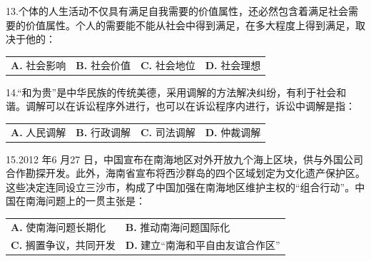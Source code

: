 \documentclass[UTF8,11pt]{ctexart}
\begin{document}
13.个体的人生活动不仅具有满足自我需要的价值属性，还必然包含着满足社会需要的价值属性。个人的需要能不能从社会中得到满足，在多大程度上得到满足，取决于他的：


\begin{center}\begin{tabular}{>{\raggedright\arraybackslash}p{\dimexpr(\linewidth-8\tabcolsep)/4\relax}>{\raggedright\arraybackslash}p{\dimexpr(\linewidth-8\tabcolsep)/4\relax}>{\raggedright\arraybackslash}p{\dimexpr(\linewidth-8\tabcolsep)/4\relax}>{\raggedright\arraybackslash}p{\dimexpr(\linewidth-8\tabcolsep)/4\relax}}
\textbf{A.} 社会影响 & \textbf{B.} 社会价值 & \textbf{C.} 社会地位 & \textbf{D.} 社会理想\\[.35em]\end{tabular}\end{center}

14.“和为贵”是中华民族的传统美德，采用调解的方法解决纠纷，有利于社会和谐。调解可以在诉讼程序外进行，也可以在诉讼程序内进行，诉讼中调解是指：


\begin{center}\begin{tabular}{>{\raggedright\arraybackslash}p{\dimexpr(\linewidth-8\tabcolsep)/4\relax}>{\raggedright\arraybackslash}p{\dimexpr(\linewidth-8\tabcolsep)/4\relax}>{\raggedright\arraybackslash}p{\dimexpr(\linewidth-8\tabcolsep)/4\relax}>{\raggedright\arraybackslash}p{\dimexpr(\linewidth-8\tabcolsep)/4\relax}}
\textbf{A.} 人民调解 & \textbf{B.} 行政调解 & \textbf{C.} 司法调解 & \textbf{D.} 仲裁调解\\[.35em]\end{tabular}\end{center}

15.2012 年6 月27 日，中国宣布在南海地区对外开放九个海上区块，供与外国公司合作勘探开发。此外，海南省宣布将西沙群岛的四个区域划定为文化遗产保护区。这些决定连同设立三沙市，构成了中国加强在南海地区维护主权的“组合行动”。中国在南海问题上的一贯主张是：


\begin{center}\begin{tabular}{>{\raggedright\arraybackslash}p{\dimexpr(\linewidth-4\tabcolsep)/2\relax}>{\raggedright\arraybackslash}p{\dimexpr(\linewidth-4\tabcolsep)/2\relax}}
\textbf{A.} 使南海问题长期化 & \textbf{B.} 推动南海问题国际化\\[.35em]
\textbf{C.} 搁置争议，共同开发 & \textbf{D.} 建立“南海和平自由友谊合作区”\\[.35em]\end{tabular}\end{center}
\end{document}

